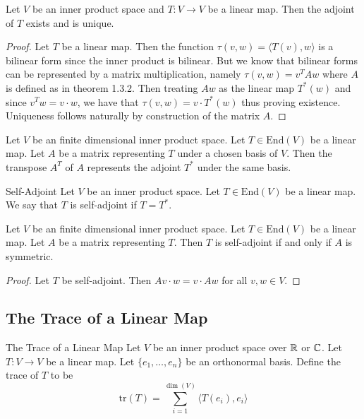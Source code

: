 \documentclass[a4paper]{article}
\begin{document}
\begin{prp}{}{} Let $V$ be an inner product space and $T:V\to V$ be a linear map. Then the adjoint of $T$ exists and is unique. \tcbline
\begin{proof}
Let $T$ be a linear map. Then the function $\tau(v,w)=\langle T(v), w\rangle$ is a bilinear form since the inner product is bilinear. But we know that bilinear forms can be represented by a matrix multiplication, namely $\tau(v,w)=v^TAw$ where $A$ is defined as in theorem 1.3.2. Then treating $Aw$ as the linear map $T^\ast(w)$ and since $v^Tw=v\cdot w$, we have that $\tau(v,w)=v\cdot T^\ast(w)$ thus proving existence. Uniqueness follows naturally by construction of the matrix $A$. 
\end{proof}
\end{prp}

\begin{prp}{}{} Let $V$ be an finite dimensional inner product space. Let $T\in\text{End}(V)$ be a linear map. Let $A$ be a matrix representing $T$ under a chosen basis of $V$. Then the transpose $A^T$ of $A$ represents the adjoint $T^\ast$ under the same basis. 
\end{prp}

\begin{defn}{Self-Adjoint}{} Let $V$ be an inner product space. Let $T\in\text{End}(V)$ be a linear map. We say that $T$ is self-adjoint if $T=T^\ast$. 
\end{defn}

\begin{prp}{}{} Let $V$ be an finite dimensional inner product space. Let $T\in\text{End}(V)$ be a linear map. Let $A$ be a matrix representing $T$. Then $T$ is self-adjoint if and only if $A$ is symmetric. \tcbline
\begin{proof}
Let $T$ be self-adjoint. Then $Av\cdot w=v\cdot Aw$ for all $v,w\in V$. 
\end{proof}
\end{prp}

\subsection{The Trace of a Linear Map}
\begin{defn}{The Trace of a Linear Map}{} Let $V$ be an inner product space over $\mathbb{R}$ or $\mathbb{C}$. Let $T:V\to V$ be a linear map. Let $\{e_1,\dots,e_n\}$ be an orthonormal basis. Define the trace of $T$ to be $$\text{tr}(T)=\sum_{i=1}^{\dim(V)}\langle T(e_i),e_i\rangle$$
\end{defn}
\end{document}
